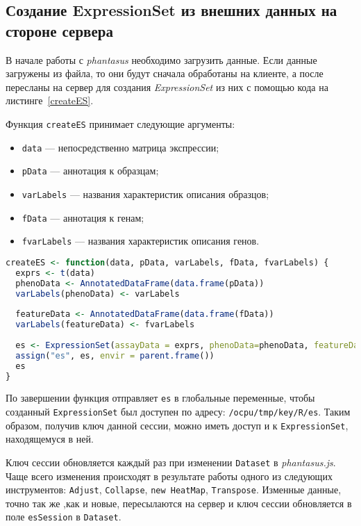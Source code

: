 \subsection{Создание ExpressionSet из внешних данных на стороне сервера} \label{createESsection}
В начале работы с \emph{phantasus} необходимо загрузить данные. Если данные загружены из файла, то они будут сначала обработаны на клиенте, а после пересланы на сервер для создания \emph{ExpressionSet} из них с помощью кода на листинге~\ref{createES}.

Функция \texttt{createES} принимает следующие аргументы:\begin{itemize}
\item \texttt{data} --- непосредственно матрица экспрессии;
\item \texttt{pData} --- аннотация к образцам;
\item \texttt{varLabels} --- названия характеристик описания образцов;
\item \texttt{fData} --- аннотация к генам;
\item \texttt{fvarLabels} --- названия характеристик описания генов.
\end{itemize}

\begin{lstlisting}[float=!h,caption={Функция создания ExpressionSet из исходных данных},label={createES},language=R]
createES <- function(data, pData, varLabels, fData, fvarLabels) {
  exprs <- t(data)
  phenoData <- AnnotatedDataFrame(data.frame(pData))
  varLabels(phenoData) <- varLabels
  
  featureData <- AnnotatedDataFrame(data.frame(fData))
  varLabels(featureData) <- fvarLabels
 
  es <- ExpressionSet(assayData = exprs, phenoData=phenoData, featureData = featureData)
  assign("es", es, envir = parent.frame())
  es
}
\end{lstlisting}

По завершении функция отправляет \texttt{es} в глобальные переменные, чтобы созданный \texttt{ExpressionSet} был доступен по адресу: \texttt{/ocpu/tmp/{key}/R/es}. Таким образом, получив ключ данной сессии, можно иметь доступ и к \texttt{ExpressionSet}, находящемуся в ней.

Ключ сессии обновляется каждый раз при изменении \texttt{Dataset} в \emph{phantasus.js}. Чаще всего изменения происходят в результате работы одного из следующих инструментов: \texttt{Adjust}, \texttt{Collapse}, \texttt{new HeatMap}, \texttt{Transpose}. Изменные данные, точно так же ,как и новые, пересылаются на сервер и ключ сессии обновляется в поле \texttt{esSession} в \texttt{Dataset}.

